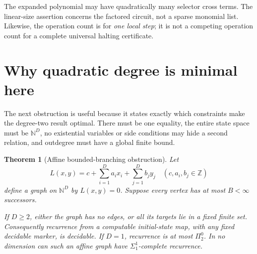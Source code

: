 \documentclass[11pt,letterpaper]{article}
\newtheorem{theorem}{Theorem}[section]
\theoremstyle{definition}
\theoremstyle{remark}
\newcommand{\N}{\mathbb N}
\newcommand{\Z}{\mathbb Z}
\newcommand{\1}{\mathbf 1}
\newcommand{\srctag}[1]{\texorpdfstring{\hspace{0.4em}{\normalfont\small\color{accent}[source #1]}}{ [source #1]}}
\begin{document}
The expanded polynomial may have quadratically many selector cross terms.
The linear-size assertion concerns the factored circuit, not a sparse
monomial list. Likewise, the operation count is for \emph{one local step};
it is not a competing operation count for a complete universal halting
certificate.
\section{Why quadratic degree is minimal here\srctag{03}}\label{lbh:qd:sec:affine}

The next obstruction is useful because it states exactly which constraints
make the degree-two result optimal. There must be one equality, the entire
state space must be $\N^D$, no existential variables or side conditions may
hide a second relation, and outdegree must have a global finite bound.

\begin{theorem}[Affine bounded-branching obstruction]\label{lbh:qd:thm:affine}
Let
\[
 L(x,y)=c+\sum_{i=1}^D a_i x_i+\sum_{j=1}^D b_j y_j
 \quad(c,a_i,b_j\in\Z)
\]
define a graph on $\N^D$ by $L(x,y)=0$. Suppose every vertex has at most
$B<\infty$ successors.

If $D\geq2$, either the graph has no edges, or all its targets lie in a fixed
finite set. Consequently recurrence from a computable initial-state map,
with any fixed decidable marker, is decidable. If $D=1$, recurrence is at
most $\Pi^0_2$. In no dimension can such an affine graph have
$\Sigma^1_1$-complete recurrence.
\end{theorem}
\end{document}
